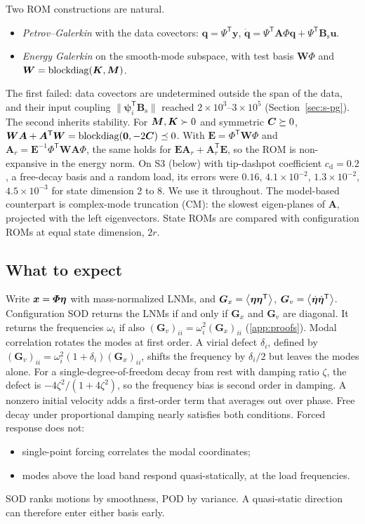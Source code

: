 \documentclass[preprint,12pt]{elsarticle}
\begin{document}
Two ROM constructions are natural.
\begin{itemize}
\item \emph{Petrov--Galerkin} with the data covectors: $\bm{q}=\bm{\varPsi}^{\mathsf T}\bm{y}$, $\dot{\bm{q}}=\bm{\varPsi}^{\mathsf T}\bm{A}\bm{\varPhi}\bm{q}+\bm{\varPsi}^{\mathsf T}\bm{B}_{\mathrm s}\bm{u}$.
\item \emph{Energy Galerkin} on the smooth-mode subspace, with test basis $\bm{W}\bm{\varPhi}$ and $\bm{W}=\operatorname{blockdiag}(\bm{K},\bm{M})$.
\end{itemize}
The first failed: data covectors are undetermined outside the span of the data, and their input coupling $\|\bm{\psi}_i^{\mathsf T}\bm{B}_{\mathrm s}\|$ reached $2\times10^3$--$3\times10^5$ (Section~\ref{sec:s-pg}).
The second inherits stability. For $\bm{M},\bm{K}\succ0$ and symmetric $\bm{C}\succeq0$, $\bm{W}\bm{A}+\bm{A}^{\mathsf T}\bm{W}=\operatorname{blockdiag}(\mathbf 0,-2\bm{C})\preceq0$. With $\bm{E}=\bm{\varPhi}^{\mathsf T}\bm{W}\bm{\varPhi}$ and $\bm{A}_r=\bm{E}^{-1}\bm{\varPhi}^{\mathsf T}\bm{W}\bm{A}\bm{\varPhi}$, the same holds for $\bm{E}\bm{A}_r+\bm{A}_r^{\mathsf T}\bm{E}$, so the ROM is non-expansive in the energy norm. On S3 (below) with tip-dashpot coefficient $c_{\mathrm d}=0.2$, a free-decay basis and a random load, its errors were $0.16$, $4.1\times10^{-2}$, $1.3\times10^{-2}$, $4.5\times10^{-3}$ for state dimension 2 to 8. We use it throughout.
The model-based counterpart is complex-mode truncation (CM): the slowest eigen-planes of $\bm{A}$, projected with the left eigenvectors.
State ROMs are compared with configuration ROMs at equal state dimension, $2r$.

\subsection{What to expect}\label{sec:expect}
Write $\bm{x}=\bm{\varPhi}\bm{\eta}$ with mass-normalized LNMs, and $\bm{G}_x=\left\langle \bm{\eta}\bm{\eta}^{\mathsf T} \right\rangle$, $\bm{G}_v=\left\langle \dot{\bm{\eta}}\dot{\bm{\eta}}^{\mathsf T} \right\rangle$.
Configuration SOD returns the LNMs if and only if $\bm{G}_x$ and $\bm{G}_v$ are diagonal. It returns the frequencies $\omega_i$ if also $(\bm{G}_v)_{ii}=\omega_i^2(\bm{G}_x)_{ii}$ (\ref{app:proofs}).
Modal correlation rotates the modes at first order. A virial defect $\delta_i$, defined by $(\bm{G}_v)_{ii}=\omega_i^2(1+\delta_i)(\bm{G}_x)_{ii}$, shifts the frequency by $\delta_i/2$ but leaves the modes alone.
For a single-degree-of-freedom decay from rest with damping ratio $\zeta$, the defect is $-4\zeta^2/(1+4\zeta^2)$, so the frequency bias is second order in damping. A nonzero initial velocity adds a first-order term that averages out over phase.
Free decay under proportional damping nearly satisfies both conditions. Forced response does not:
\begin{itemize}
\item single-point forcing correlates the modal coordinates;
\item modes above the load band respond quasi-statically, at the load frequencies.
\end{itemize}
SOD ranks motions by smoothness, POD by variance. A quasi-static direction can therefore enter either basis early.
\end{document}

